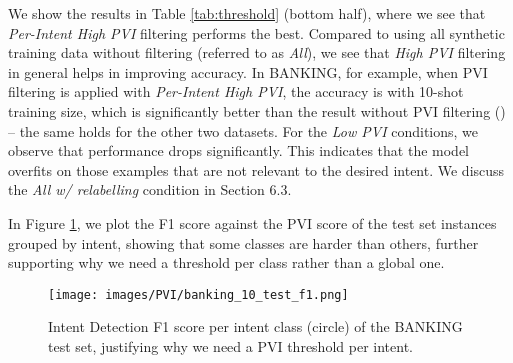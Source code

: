 \documentclass[11pt]{article}
\begin{document}
We show the results in Table \ref{tab:threshold} (bottom half), where we see that \textit{Per-Intent High PVI} filtering performs the best. 
Compared to using all synthetic training data without filtering (referred to as \textit{All}), we see that \textit{High PVI} filtering in general helps in improving accuracy.
In BANKING, for example, when PVI filtering is applied with \textit{Per-Intent High PVI}, the accuracy is  with 10-shot training size, which is significantly better than the result without PVI filtering () -- the same holds for the other two datasets. 
For the \textit{Low PVI} conditions, we observe that performance drops significantly.
This indicates that the model overfits on those examples that are not relevant to the desired intent. We discuss the \textit{All w/ relabelling} condition in Section 6.3. 

In Figure \ref{fig:f1_pvi}, we plot the F1 score against the PVI score of the test set instances grouped by intent, showing that some classes are harder than others, further supporting why we need a threshold per class rather than a global one.

\begin{figure}[ht]
    \centering
    \texttt{[image: images/PVI/banking\_10\_test\_f1.png]}
    \caption{Intent Detection F1 score per intent class (circle) of the BANKING test set, justifying why we need a PVI threshold per intent.}
    \label{fig:f1_pvi}
\end{figure}
\end{document}
